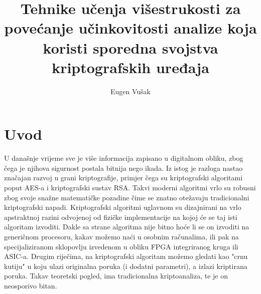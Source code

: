 \documentclass[times, utf8, diplomski]{fer}
\begin{document}

\title{
    Tehnike učenja višestrukosti za povećanje učinkovitosti
    analize koja koristi sporedna svojstva kriptografskih uređaja
}

\author{Eugen Vušak}

\maketitle

\izvornik

\zahvala{}

\tableofcontents


\chapter{Uvod}
U današnje vrijeme sve je više informacija zapisano u digitalnom obliku, zbog čega je njihova sigurnost postala bitnija nego ikada. Iz istog je razloga nastao značajan razvoj u grani kriptografije, primjer čega su kriptografski algoritami poput AES-a i kriptografski sustav RSA. Takvi moderni algoritmi vrlo su robusni zbog svoje snažne matematičke pozadine čime se znatno otežavaju tradicionalni kriptografski napadi. Kriptografski algoritmi uglavnom su dizajnirani na vrlo apstraktnoj razini odvojenoj od fizičke implementacije na kojoj će se taj isti algoritam izvoditi. Dakle sa strane algoritma nije bitno hoće li se on izvoditi na generičnom procesoru, kakav možemo naći u osobnim računalima, ili pak na specijaliziranom sklopovlju izvedenom u obliku FPGA integriranog kruga ili ASIC-a. Drugim riječima, na kriptografski algoritam možemo gledati kao "crnu kutiju" u koju ulazi originalna poruka (i dodatni parametri), a izlazi kriptirana poruka. Takav teoretski pogled, ima tradicionalna kriptoanaliza, te je on neosporivo bitan.
\end{document}
